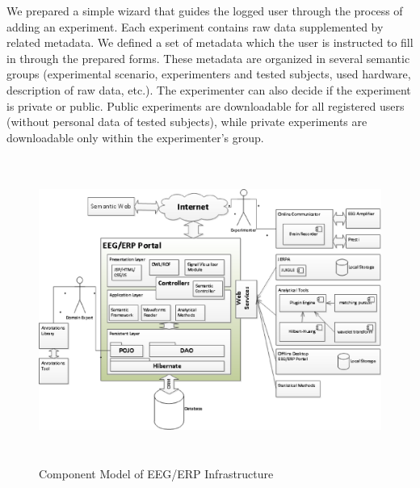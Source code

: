 \documentclass[a4paper,twoside]{article}
\begin{document}
We prepared a simple wizard that guides the logged user through the process of adding an experiment. Each experiment contains raw data supplemented by related metadata. We defined a set of metadata which the user is instructed to fill in through the prepared forms. These metadata are organized in several semantic groups (experimental scenario, experimenters and tested subjects, used hardware, description of raw data, etc.). The experimenter can also decide if the experiment is private or public. Public experiments are downloadable for all registered users (without personal data of tested subjects), while private experiments are downloadable only within the experimenter's group.

\begin{figure}
	\centering
\includegraphics[width=15cm, height=10cm]{component_model_2}

\caption{\label{fig:Component Model of EEG/ERP Infrastructure}Component Model of EEG/ERP Infrastructure}

\end{figure}
\end{document}
